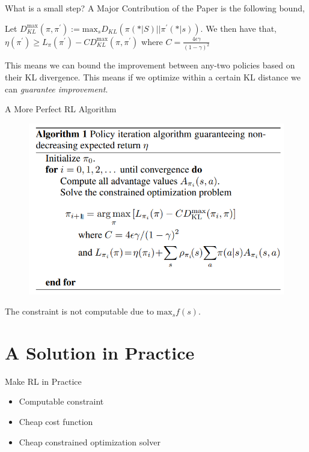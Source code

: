 \documentclass{beamer}
\begin{document}
\begin{frame}{What is a small step?}
A Major Contribution of the Paper is the following bound, 

\begin{theorem}
Let $D_{KL}^{\text{max}}(\pi, \pi^\prime) := \text{max}_s D_{KL}\left(\pi(* \vert S) \vert\vert \pi^\prime(*\lvert s) \right).$ We then have that, 
$\eta(\pi^\prime) \geq L_{\pi}(\pi^\prime) - C D_{KL}^{\text{max}}(\pi, \pi^\prime)$ where $C = \frac{4 \epsilon \gamma}{(1-\gamma)^2}$
\end{theorem}
This  means we can bound the improvement between any-two policies based on their KL divergence. This means if we optimize within a certain KL distance we can \textit{guarantee improvement}. 
\end{frame}


\begin{frame}{A More Perfect RL Algorithm}
    \begin{figure}
        \centering
        \includegraphics[width=0.7\linewidth]{TRPO_algo .png}
        \label{fig:enter-label}
    \end{figure}

The constraint is not computable due to $\text{max}_{s} f(s)$.
\end{frame}

\section{A Solution in Practice}

\begin{frame}{Make RL in Practice}
    \begin{itemize}
        \item Computable constraint 
        \vspace{4pt}
        \item Cheap cost function 
        \vspace{4pt}
        \item Cheap constrained optimization solver
    \end{itemize}
    
\end{frame}
\end{document}

